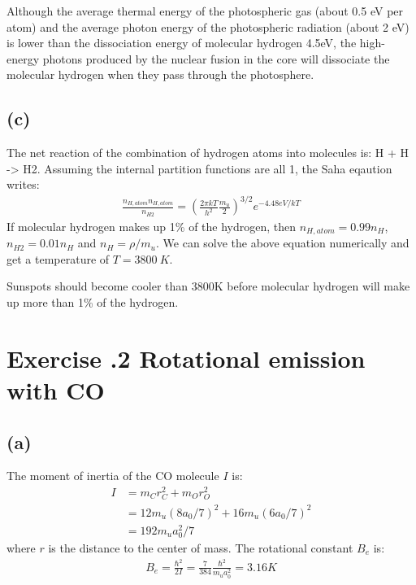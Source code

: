 \documentclass[a4paper,12pt]{article}
\begin{document}
Although the average thermal energy of the photospheric gas (about 0.5 eV per atom) and the average photon energy of the photospheric radiation (about 2 eV) is lower than the dissociation energy of molecular hydrogen 4.5eV, 
the high-energy photons produced by the nuclear fusion in the core will dissociate the molecular hydrogen when they pass through the photosphere.

\subsection*{(c)}
The net reaction of the combination of hydrogen atoms into molecules is: H + H -> H2.
Assuming the internal partition functions are all 1, the Saha eqaution writes:
\begin{align*}
    \frac{n_{H, atom} n_{H, atom}}{n_{H2}} = (\frac{2\pi kT}{h^2} \frac{m_u}{2})^{3/2} e^{-4.48eV/kT}
\end{align*}
If molecular hydrogen makes up 1\% of the hydrogen, then $n_{H, atom} = 0.99 n_H$, $n_{H2} = 0.01 n_H$ and $n_H = \rho/m_u$.
We can solve the above equation numerically and get a temperature of $T=3800\ K$.

Sunspots should become cooler than 3800K before molecular hydrogen will make 
up more than 1\% of the hydrogen.

\section*{\textbf{Exercise \uppercase\expandafter{}.2 Rotational emission with CO}}
\subsection*{(a)}
The moment of inertia of the CO molecule $I$ is:
\begin{align*}
    I &= m_C r_C^2 + m_O r_O^2 \\
      &= 12 m_u (8a_0/7)^2 + 16 m_u (6a_0 /7)^2 \\
      &= 192m_u a_0^2/7 
\end{align*}
where $r$ is the distance to the center of mass.
The rotational constant $B_e$ is:
\begin{align*}
    B_e = \frac{\hbar^2}{2I} = \frac{7}{384}\frac{\hbar^2}{m_ua_0^2} = 3.16 K
\end{align*}
\end{document}
